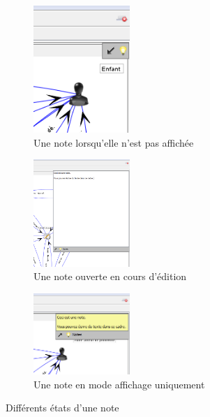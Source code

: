 \begin{figure}[h!]
\centering
\begin{subfigure}{\textwidth}

\centering
\includegraphics[width=0.4\textwidth]{../images/note_fermee.png}
\caption{Une note lorsqu'elle n'est pas affichée}
\end{subfigure}
\begin{subfigure}{\textwidth}

\centering
\includegraphics[width=0.4\textwidth]{../images/note_ouverte_edition.png}
\caption{Une note ouverte en cours d'édition}
\end{subfigure}
\begin{subfigure}{\textwidth}

\centering
\includegraphics[width=0.4\textwidth]{../images/note_ouverte_pas_edition.png}
\caption{Une note en mode affichage uniquement}
\end{subfigure}
\caption{Différents états d'une note}
\end{figure}



